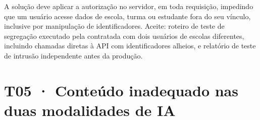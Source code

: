 \begin{paraotr}
A solução deve aplicar a autorização no servidor, em toda requisição,
impedindo que um usuário acesse dados de escola, turma ou estudante fora do
seu vínculo, inclusive por manipulação de identificadores. Aceite: roteiro de
teste de segregação executado pela contratada com dois usuários de escolas
diferentes, incluindo chamadas diretas à API com identificadores alheios, e
relatório de teste de intrusão independente antes da produção.
\end{paraotr}

\section{T05 · Conteúdo inadequado nas duas modalidades de IA}
\label{sec:t05}

